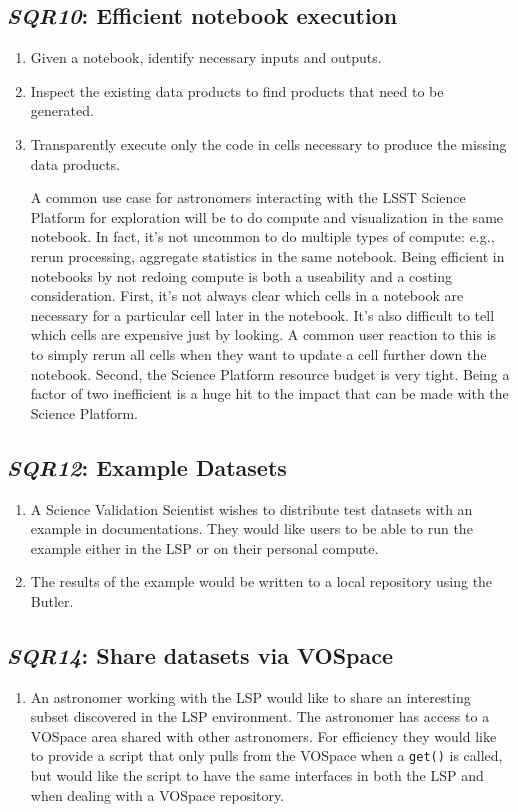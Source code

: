 \documentclass[DM,toc,lsstdraft]{lsstdoc}
\newcommand{\usecase}[3]{%
\subsection{\emph{#1}: #2}
\label{use:#1}
\begin{enumerate}[label=\alph*.]
#3
\end{enumerate}
}
\begin{document}
\usecase{SQR10}{Efficient notebook execution}{%

\item
Given a notebook, identify necessary inputs and outputs.

\item
Inspect the existing data products to find products that need to be generated.

\item
Transparently execute only the code in cells necessary to produce the missing data products.

A common use case for astronomers interacting with the LSST Science Platform for exploration will be to do compute and visualization in the same notebook.
In fact, it's not uncommon to do multiple types of compute: e.g., rerun processing, aggregate statistics in the same notebook.
Being efficient in notebooks by not redoing compute is both a useability and a costing consideration.
First, it's not always clear which cells in a notebook are necessary for a particular cell later in the notebook.
It's also difficult to tell which cells are expensive just by looking.
A common user reaction to this is to simply rerun all cells when they want to update a cell further down the notebook.
Second, the Science Platform resource budget is very tight.
Being a factor of two inefficient is a huge hit to the impact that can be made with the Science Platform.

}

\usecase{SQR12}{Example Datasets}{%

\item
A Science Validation Scientist wishes to distribute test datasets with an example in documentations.
They would like users to be able to run the example either in the LSP or on their personal compute.

\item
The results of the example would be written to a local repository using the Butler.

}

\usecase{SQR14}{Share datasets via VOSpace}{%

\item
An astronomer working with the LSP would like to share an interesting subset discovered in the LSP environment.
The astronomer has access to a VOSpace area shared with other astronomers.
For efficiency they would like to provide a script that only pulls from the VOSpace when a \texttt{get()} is called, but would like the script to have the same interfaces in both the LSP and when dealing with a VOSpace repository.

}
\end{document}
